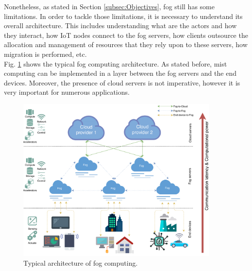 Nonetheless, as stated in Section \ref{subsec:Objectives}, fog still has some limitations. In order to tackle those limitations, it is necessary to understand its overall architecture. This includes understanding what are the actors and how they interact, how IoT nodes connect to the fog servers, how clients outsource the allocation and management of resources that they rely upon to these servers, how migration is performed, etc.\\
\noindent\tab Fig. \ref{fog_architecture} shows the typical fog computing architecture. As stated before, mist computing can be implemented in a layer between the fog servers and the end devices. Moreover, the presence of cloud servers is not imperative, however it is very important for numerous applications.

\begin{figure} [t]
	\centering
	\includegraphics[width=0.9\textwidth]{images/fog_architecture/fog_architecture}
	\caption{Typical architecture of fog computing.}
	\label{fog_architecture}
\end{figure}

